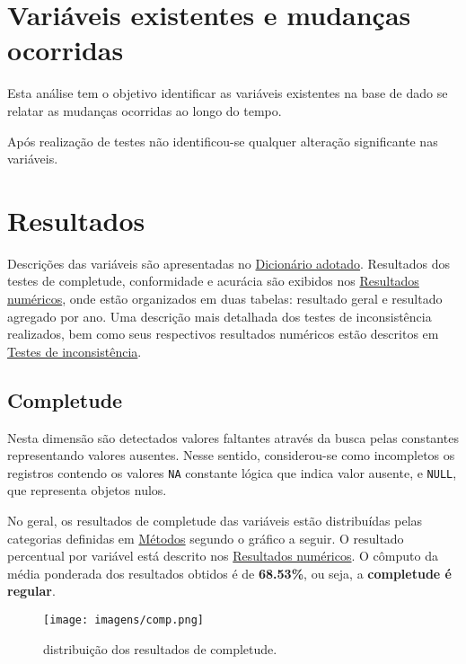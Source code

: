 \documentclass[
  12,
  table]{proadi}
\begin{document}
\hypertarget{variuxe1veis-existentes-e-mudanuxe7as-ocorridas}{%
\section{Variáveis existentes e mudanças
ocorridas}\label{variuxe1veis-existentes-e-mudanuxe7as-ocorridas}}

Esta análise tem o objetivo identificar as variáveis existentes na base
de dado se relatar as mudanças ocorridas ao longo do tempo.

Após realização de testes não identificou-se qualquer alteração
significante nas variáveis.

\hypertarget{resultados}{%
\section{Resultados}\label{resultados}}

Descrições das variáveis são apresentadas no
\protect\hyperlink{dicionuxe1rio-adotado}{Dicionário adotado}.
Resultados dos testes de completude, conformidade e acurácia são
exibidos nos \protect\hyperlink{resultados-numuxe9ricos}{Resultados
numéricos}, onde estão organizados em duas tabelas: resultado geral e
resultado agregado por ano. Uma descrição mais detalhada dos testes de
inconsistência realizados, bem como seus respectivos resultados
numéricos estão descritos em
\protect\hyperlink{testes-de-inconsistuxeancia}{Testes de
inconsistência}.

\hypertarget{completude}{%
\subsection{Completude}\label{completude}}

Nesta dimensão são detectados valores faltantes através da busca pelas
constantes representando valores ausentes. Nesse sentido, considerou-se
como incompletos os registros contendo os valores \texttt{NA} constante
lógica que indica valor ausente, e \texttt{NULL}, que representa objetos
nulos.

No geral, os resultados de completude das variáveis estão distribuídas
pelas categorias definidas em \protect\hyperlink{muxe9todos}{Métodos}
segundo o gráfico a seguir. O resultado percentual por variável está
descrito nos \protect\hyperlink{resultados-numuxe9ricos}{Resultados
numéricos}. O cômputo da média ponderada dos resultados obtidos é de
\textbf{68.53\%}, ou seja, a \textbf{completude é regular}.

\begin{figure}
\centering
\texttt{[image: imagens/comp.png]}
\caption{distribuição dos resultados de completude.}
\end{figure}
\end{document}
